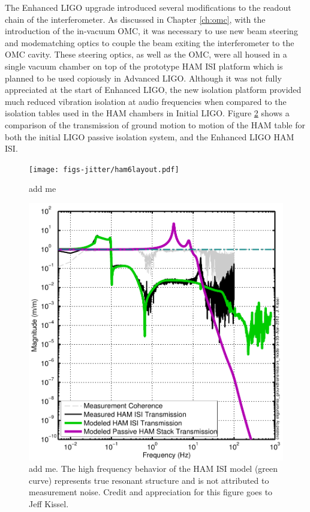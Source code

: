 The Enhanced LIGO upgrade introduced several modifications to the readout chain of the interferometer. %
As discussed in Chapter \ref{ch:omc}, with the introduction of the in-vacuum OMC, it was necessary to use new beam steering and modematching optics to couple the beam exiting the interferometer to the OMC cavity. %
These steering optics, as well as the OMC, were all housed in a single vacuum chamber on top of the prototype HAM ISI platform which is planned to be used copiously in Advanced LIGO. %
Although it was not fully appreciated at the start of Enhanced LIGO, the new isolation platform provided much reduced vibration isolation at audio frequencies when compared to the isolation tables used in the HAM chambers in Initial LIGO. %
Figure \ref{fig:hamtransmission} shows a comparison of the transmission of ground motion to motion of the HAM table for both the initial LIGO passive isolation system, and the Enhanced LIGO HAM ISI.

\begin{figure}
  \begin{center}
  \leavevmode
  \texttt{[image: figs-jitter/ham6layout.pdf]}
  \end{center}
  \caption[add me]{add me }
  \label{fig:ham6layout}
\end{figure}

\begin{figure}
  \begin{center}
  \leavevmode
  \includegraphics{figs-jitter/hamtransmission.pdf}
  \end{center}
  \caption[add me]{add me. The high frequency behavior of the HAM ISI model (green curve) represents true resonant structure and is not attributed to measurement noise. Credit and appreciation for this figure goes to Jeff Kissel.}
  \label{fig:hamtransmission}
\end{figure}

